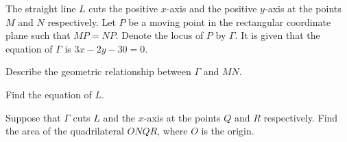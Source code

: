 
The straight line $L$ cuts the positive $x$-axis and the positive $y$-axis at the points $M$ and $N$ respectively. Let $P$ be a moving point in the rectangular coordinate plane such that $MP=NP$. Denote the locus of $P$ by $\Gamma$. It is given that the equation of $\Gamma$ is $3x-2y-30=0$.


\begin{enumx}[label=(\alph*)]
	\item Describe the geometric relationship between $\Gamma$ and $MN$.
    \item Find the equation of $L$.
    \item Suppose that $\Gamma$ cuts $L$ and the $x$-axis at the points $Q$ and $R$ respectively. Find the area of the quadrilateral $ONQR$, where $O$ is the origin.

\end{enumx}




